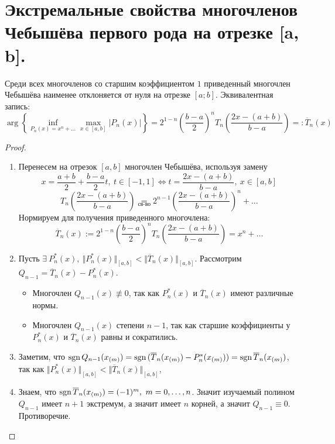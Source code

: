 \section{Экстремальные свойства многочленов Чебышёва первого рода на отрезке [a, b].}

\begin{theorem}
  Среди всех многочленов со старшим коэффициентом $1$
  приведенный многочлен Чебышёва наименее
  отклоняется от нуля на отрезке $[a;b]$. Эквивалентная запись:
  \[\arg\left\{\inf_{P_n(x)=x^n+\ldots}\max_{x\in[a,b]}{|P_n(x)|}\right\}=2^{1-n}\left(\frac{b-a}{2}\right)^nT_n\left(\frac{2x-(a+b)}{b-a}\right)=:\overline{T}_n(x)\]
\end{theorem}
\begin{proof}
  \begin{enumerate}
    \item Перенесем на отрезок $[a,b]$ многочлен Чебышёва, используя замену
          \[x=\frac{a+b}{2}+\frac{b-a}{2}t,\ t\in[-1,1]\Leftrightarrow t=\frac{2x-(a+b)}{b-a},\ x\in[a,b]\]
          \[T_n\left(\frac{2x-(a+b)}{b-a}\right)\underset{\text{св-во}}{=}2^{n-1}\left(\frac{2x-(a+b)}{b-a}\right)^n+\ldots\]
          Нормируем для получения приведенного многочлена:
          \[\overline{T}_n(x):=2^{1-n}\left(\frac{b-a}{2}\right)^nT_n\left(\frac{2x-(a+b)}{b-a}\right)=x^n+\ldots\]
    \item Пусть $\exists\ P_n^*(x),\ \Vert P_n^*(x)\Vert_{[a,b]}<\Vert\overline{T}_n(x)\Vert_{[a,b]}$.
          Рассмотрим $Q_{n-1}=\overline{T}_n(x)-P_n^*(x)$.
          \begin{itemize}
            \item Многочлен $Q_{n-1}(x)\not\equiv0$, так
                  как $P_n^*(x)$ и $\overline{T}_n(x)$ имеют различные нормы.
            \item Многочлен $Q_{n-1}(x)$ степени $n-1$, так
                  как старшие коэффициенты у $P_n^*(x)$ и $\overline{T}_n(x)$ равны и сократились.
          \end{itemize}
    \item Заметим, что $\operatorname{sgn}{Q_{n-1}(x_{(m)})}=\operatorname{sgn}{(\overline{T}_n(x_{(m)})-P_n^*(x_{(m)}))}=\operatorname{sgn}{\overline{T}_n(x_{(m)})}$, так как
          $\Vert P_n^*(x)\Vert_{[a,b]}<\Vert\overline{T}_n(x)\Vert_{[a,b]}$,
    \item Знаем, что $\sgn{\overline{T}_n(x_{(m)})}=(-1)^m,\ m=0,\ldots,n$. Значит
          изучаемый полином $Q_{n-1}$ имеет $n+1$ экстремум, а значит имеет $n$ корней,
          а значит $Q_{n-1}\equiv0$. Противоречие.
  \end{enumerate}
\end{proof}


